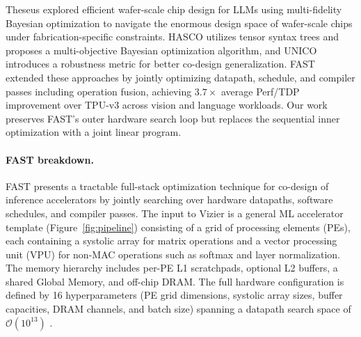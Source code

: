 Theseus \citep{zhu2024theseusexploringefficientwaferscale} explored efficient wafer-scale chip design for LLMs using multi-fidelity Bayesian optimization to navigate the enormous design space of wafer-scale chips under fabrication-specific constraints. 
HASCO \citep{xiao2021hasco} utilizes tensor syntax trees and proposes a multi-objective Bayesian optimization algorithm, and UNICO \citep{rashidi2023unico} introduces a robustness metric for better co-design generalization.
FAST extended these approaches by jointly optimizing datapath, schedule, and compiler passes including operation fusion, achieving $3.7\times$ average Perf/TDP improvement over TPU-v3 across vision and language workloads.
Our work preserves FAST's outer hardware search loop but replaces the sequential inner optimization with a joint linear program.

\paragraph{FAST breakdown.} FAST presents a tractable full-stack optimization technique for co-design of inference accelerators by jointly searching over hardware datapaths, software schedules, and compiler passes.
The input to Vizier is a general ML accelerator template (Figure~\ref{fig:pipeline}) consisting of a grid of processing elements (PEs), each containing a systolic array for matrix operations and a vector processing unit (VPU) for non-MAC operations such as softmax and layer normalization.
The memory hierarchy includes per-PE L1 scratchpads, optional L2 buffers, a shared Global Memory, and off-chip DRAM.
The full hardware configuration is defined by 16 hyperparameters (PE grid dimensions, systolic array sizes, buffer capacities, DRAM channels, and batch size) spanning a datapath search space of $\mathcal O(10^{13})$ \citep[Table~3]{zhang_fast}. 


